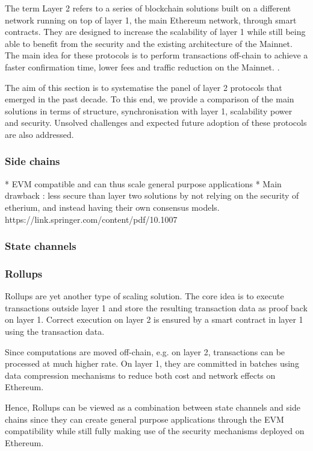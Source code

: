 The term Layer 2 refers to a series of blockchain solutions built on a different network running on top of layer 1, the main Ethereum network, through smart contracts. They are designed to increase the scalability of layer 1 while still being able to benefit from the security and the existing architecture of the Mainnet. The main idea for these protocols is to perform transactions off-chain to achieve a faster confirmation time, lower fees and traffic reduction on the Mainnet. \cite{gudgeon_sok_2020, noauthor_layer_nodate}.

The aim of this section is to systematise the panel of layer 2 protocols that emerged in the past decade. To this end, we provide a comparison of the main solutions in terms of structure, synchronisation with layer 1, scalability power and security. Unsolved challenges and expected future adoption of these protocols are also addressed.  


\subsubsection{Side chains}
* EVM compatible and can thus scale general purpose applications
* Main drawback : less secure than layer two solutions by not relying on the security of etherium, and instead having their own consensus models. 
https://link.springer.com/content/pdf/10.1007%
\subsubsection{State channels}
\subsubsection{Rollups}

Rollups are yet another type of scaling solution. The core idea is to execute transactions outside layer 1 and store the resulting transaction data as proof back on layer 1. Correct execution on layer 2 is ensured by a smart contract in layer 1 using the transaction data. 

Since computations are moved off-chain, e.g. on layer 2, transactions can be processed at much higher rate. On layer 1, they are committed in batches using data compression mechanisms to reduce both cost and network effects on Ethereum. 

Hence, Rollups can be viewed as a combination between state channels and side chains since they can create general purpose applications through the EVM compatibility while still fully making use of the security mechanisms deployed on Ethereum.

